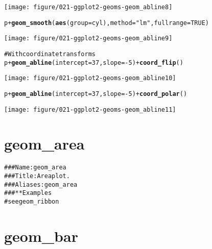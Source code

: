 \documentclass[a4paper,titlepage]{tufte-handout}\usepackage{graphicx, color}
\makeatletter
\def\maxwidth{ %
  \ifdim\Gin@nat@width>\linewidth
    \linewidth
  \else
    \Gin@nat@width
  \fi
}
\newcommand{\hlfunctioncall}[1]{\textcolor[rgb]{0.501960784313725,0,0.329411764705882}{\textbf{#1}}}%
\newcommand{\hlstring}[1]{\textcolor[rgb]{0.6,0.6,1}{#1}}%
\newcommand{\hlcomment}[1]{\textcolor[rgb]{0.180392156862745,0.6,0.341176470588235}{#1}}%
\newenvironment{kframe}{%
 \def\at@end@of@kframe{}%
 \ifinner\ifhmode%
  \def\at@end@of@kframe{\end{minipage}}%
  \begin{minipage}{\columnwidth}%
 \fi\fi%
 \def\FrameCommand##1{\hskip\@totalleftmargin \hskip-\fboxsep
 \colorbox{shadecolor}{##1}\hskip-\fboxsep
     \hskip-\linewidth \hskip-\@totalleftmargin \hskip\columnwidth}%
 \MakeFramed {\advance\hsize-\width
   \@totalleftmargin\z@ \linewidth\hsize
   \@setminipage}}%
 {\par\unskip\endMakeFramed%
 \at@end@of@kframe}
\newenvironment{knitrout}{}{} %
\makeatother
\begin{document}
\begin{knitrout}
\begin{kframe}
\end{kframe}\texttt{[image: figure/021-ggplot2-geoms-geom\_abline8]} \begin{kframe}\begin{alltt}
p + \hlfunctioncall{geom_smooth}(\hlfunctioncall{aes}(group=cyl), method=\hlstring{"lm"}, fullrange=TRUE)
\end{alltt}
\end{kframe}\texttt{[image: figure/021-ggplot2-geoms-geom\_abline9]} \begin{kframe}\begin{alltt}
\hlcomment{# With coordinate transforms}
p + \hlfunctioncall{geom_abline}(intercept = 37, slope = -5) + \hlfunctioncall{coord_flip}()
\end{alltt}
\end{kframe}\texttt{[image: figure/021-ggplot2-geoms-geom\_abline10]} \begin{kframe}\begin{alltt}
p + \hlfunctioncall{geom_abline}(intercept = 37, slope = -5) + \hlfunctioncall{coord_polar}()
\end{alltt}
\end{kframe}\texttt{[image: figure/021-ggplot2-geoms-geom\_abline11]} 
\end{knitrout}


\section{geom\_area}

\begin{knitrout}
\color{fgcolor}\begin{kframe}
\begin{alltt}
\hlcomment{### Name: geom_area}
\hlcomment{### Title: Area plot.}
\hlcomment{### Aliases: geom_area}
\hlcomment{### ** Examples}
\hlcomment{# see geom_ribbon}
\end{alltt}
\end{kframe}
\end{knitrout}


\section{geom\_bar}
\end{document}
